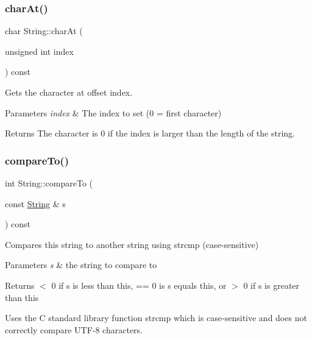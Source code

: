 \subsubsection{\texorpdfstring{char\+At()}{charAt()}}
{\footnotesize\ttfamily char String\+::char\+At (\begin{DoxyParamCaption}\item[{unsigned int}]{index }\end{DoxyParamCaption}) const}



Gets the character at offset index. 


\begin{DoxyParams}{Parameters}
{\em index} & The index to set (0 = first character)\\
\hline
\end{DoxyParams}
\begin{DoxyReturn}{Returns}
The character is 0 if the index is larger than the length of the string. 
\end{DoxyReturn}
\mbox{\label{class_string_ab95c64acc3d5105efdc9709a4cc31e76}} 
\subsubsection{\texorpdfstring{compare\+To()}{compareTo()}}
{\footnotesize\ttfamily int String\+::compare\+To (\begin{DoxyParamCaption}\item[{const \hyperlink{class_string}{String} \&}]{s }\end{DoxyParamCaption}) const}



Compares this string to another string using strcmp (case-\/sensitive) 


\begin{DoxyParams}{Parameters}
{\em s} & the string to compare to\\
\hline
\end{DoxyParams}
\begin{DoxyReturn}{Returns}
$<$ 0 if s is less than this, == 0 is s equals this, or $>$ 0 if s is greater than this
\end{DoxyReturn}
Uses the C standard library function strcmp which is case-\/sensitive and does not correctly compare U\+T\+F-\/8 characters. \mbox{\label{class_string_a63f64f8a3da37d4570ce7b2ceec5bd2b}} 
